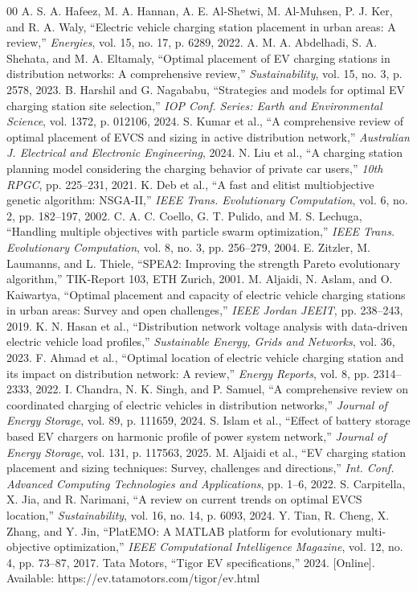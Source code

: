 \documentclass[conference]{IEEEtran}
\begin{document}
\begin{thebibliography}{00}
 A. S. A. Hafeez, M. A. Hannan, A. E. Al-Shetwi, M. Al-Muhsen, P. J. Ker, and R. A. Waly, ``Electric vehicle charging station placement in urban areas: A review,'' \textit{Energies}, vol. 15, no. 17, p. 6289, 2022.
 A. M. A. Abdelhadi, S. A. Shehata, and M. A. Eltamaly, ``Optimal placement of EV charging stations in distribution networks: A comprehensive review,'' \textit{Sustainability}, vol. 15, no. 3, p. 2578, 2023.
 B. Harshil and G. Nagababu, ``Strategies and models for optimal EV charging station site selection,'' \textit{IOP Conf. Series: Earth and Environmental Science}, vol. 1372, p. 012106, 2024.
 S. Kumar et al., ``A comprehensive review of optimal placement of EVCS and sizing in active distribution network,'' \textit{Australian J. Electrical and Electronic Engineering}, 2024.
 N. Liu et al., ``A charging station planning model considering the charging behavior of private car users,'' \textit{10th RPGC}, pp. 225--231, 2021.
 K. Deb et al., ``A fast and elitist multiobjective genetic algorithm: NSGA-II,'' \textit{IEEE Trans. Evolutionary Computation}, vol. 6, no. 2, pp. 182--197, 2002.
 C. A. C. Coello, G. T. Pulido, and M. S. Lechuga, ``Handling multiple objectives with particle swarm optimization,'' \textit{IEEE Trans. Evolutionary Computation}, vol. 8, no. 3, pp. 256--279, 2004.
 E. Zitzler, M. Laumanns, and L. Thiele, ``SPEA2: Improving the strength Pareto evolutionary algorithm,'' TIK-Report 103, ETH Zurich, 2001.
 M. Aljaidi, N. Aslam, and O. Kaiwartya, ``Optimal placement and capacity of electric vehicle charging stations in urban areas: Survey and open challenges,'' \textit{IEEE Jordan JEEIT}, pp. 238--243, 2019.
 K. N. Hasan et al., ``Distribution network voltage analysis with data-driven electric vehicle load profiles,'' \textit{Sustainable Energy, Grids and Networks}, vol. 36, 2023.
 F. Ahmad et al., ``Optimal location of electric vehicle charging station and its impact on distribution network: A review,'' \textit{Energy Reports}, vol. 8, pp. 2314--2333, 2022.
 I. Chandra, N. K. Singh, and P. Samuel, ``A comprehensive review on coordinated charging of electric vehicles in distribution networks,'' \textit{Journal of Energy Storage}, vol. 89, p. 111659, 2024.
 S. Islam et al., ``Effect of battery storage based EV chargers on harmonic profile of power system network,'' \textit{Journal of Energy Storage}, vol. 131, p. 117563, 2025.
 M. Aljaidi et al., ``EV charging station placement and sizing techniques: Survey, challenges and directions,'' \textit{Int. Conf. Advanced Computing Technologies and Applications}, pp. 1--6, 2022.
 S. Carpitella, X. Jia, and R. Narimani, ``A review on current trends on optimal EVCS location,'' \textit{Sustainability}, vol. 16, no. 14, p. 6093, 2024.
 Y. Tian, R. Cheng, X. Zhang, and Y. Jin, ``PlatEMO: A MATLAB platform for evolutionary multi-objective optimization,'' \textit{IEEE Computational Intelligence Magazine}, vol. 12, no. 4, pp. 73--87, 2017.
 Tata Motors, ``Tigor EV specifications,'' 2024. [Online]. Available: https://ev.tatamotors.com/tigor/ev.html
\end{thebibliography}
\end{document}
